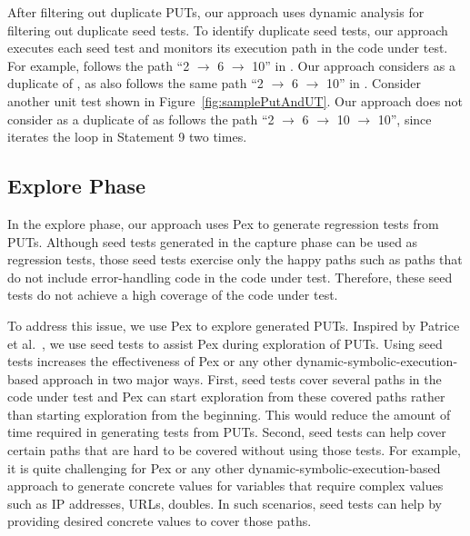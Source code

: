After filtering out duplicate PUTs, our approach uses dynamic analysis for filtering 
out duplicate seed tests. To identify duplicate seed tests,
our approach executes each seed test and monitors its execution path 
in the code under test. For example,  follows the 
path ``2 $\rightarrow$ 6 $\rightarrow$ 10'' in . Our approach considers 
 as a duplicate of , as 
also follows the same path ``2 $\rightarrow$ 6 $\rightarrow$ 10'' in . 
Consider another unit test  shown in Figure~\ref{fig:samplePutAndUT}.
Our approach does not consider  as a duplicate of 
as  follows the path ``2 $\rightarrow$ 6 $\rightarrow$ 10 $\rightarrow$ 10'',
since  iterates the loop in Statement 9 two times.

\subsection{Explore Phase}
\label{sec:explore}

In the explore phase, our approach uses Pex to generate regression tests from PUTs. Although
seed tests generated in the capture phase can be used as regression tests, those
seed tests exercise only the happy paths such as paths that do not include 
error-handling code in the code under test. Therefore, these seed tests do not
achieve a high coverage of the code under test. 

To address this issue, we use Pex to explore generated PUTs. Inspired by Patrice et al.~\cite{patrice08:whitebox},
we use seed tests to assist Pex during exploration of PUTs. Using seed tests increases
the effectiveness of Pex or any other dynamic-symbolic-execution-based approach in two major ways. First,
seed tests cover several paths in the code under test and Pex can start exploration
from these covered paths rather than starting exploration from the beginning. This 
would reduce the amount of time required in generating tests from PUTs. Second,
seed tests can help cover certain paths that are hard to be covered without using
those tests. For example, it is quite challenging for Pex or any other 
dynamic-symbolic-execution-based approach to generate concrete values for variables
that require complex values such as IP addresses, URLs, doubles. In such scenarios,
seed tests can help by providing desired concrete values to cover those paths.

